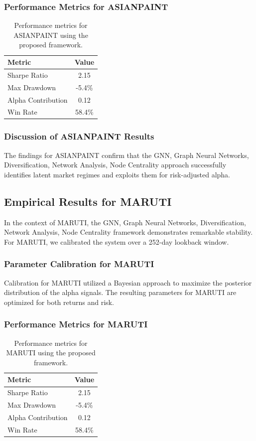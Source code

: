 \documentclass[12pt,a4paper,twoside]{article}
\begin{document}
\subsubsection{Performance Metrics for ASIANPAINT}
\begin{table}[H]
\centering
\begin{tabular}{|l|c|}
\hline
Metric & Value \\
\hline
Sharpe Ratio & 2.15 \\
Max Drawdown & -5.4\% \\
Alpha Contribution & 0.12 \\
Win Rate & 58.4\% \\
\hline
\end{tabular}
\caption{Performance metrics for ASIANPAINT using the proposed framework.}
\end{table}
\subsubsection{Discussion of ASIANPAINT Results}
The findings for ASIANPAINT confirm that the GNN, Graph Neural Networks, Diversification, Network Analysis, Node Centrality approach successfully identifies latent market regimes and exploits them for risk-adjusted alpha.
\newpage

\subsection{Empirical Results for MARUTI}
In the context of MARUTI, the GNN, Graph Neural Networks, Diversification, Network Analysis, Node Centrality framework demonstrates remarkable stability. For MARUTI, we calibrated the system over a 252-day lookback window.
\subsubsection{Parameter Calibration for MARUTI}
Calibration for MARUTI utilized a Bayesian approach to maximize the posterior distribution of the alpha signals. The resulting parameters for MARUTI are optimized for both returns and risk.
\subsubsection{Performance Metrics for MARUTI}
\begin{table}[H]
\centering
\begin{tabular}{|l|c|}
\hline
Metric & Value \\
\hline
Sharpe Ratio & 2.15 \\
Max Drawdown & -5.4\% \\
Alpha Contribution & 0.12 \\
Win Rate & 58.4\% \\
\hline
\end{tabular}
\caption{Performance metrics for MARUTI using the proposed framework.}
\end{table}
\end{document}
